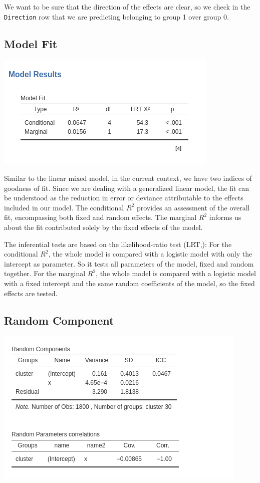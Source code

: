 \documentclass[
]{book}
\begin{document}
We want to be sure that the direction of the effects are clear, so we check in the \texttt{Direction} row that we are predicting belonging to group 1 over group 0.

\hypertarget{model-fit-3}{%
\subsection{Model Fit}\label{model-fit-3}}

\includegraphics[width=0.6\linewidth]{bookletpics/5_logistic_output2}

Similar to the linear mixed model, in the current context, we have two indices of goodness of fit. Since we are dealing with a generalized linear model, the fit can be understood as the reduction in error or deviance attributable to the effects included in our model. The conditional \(R^2\) provides an assessment of the overall fit, encompassing both fixed and random effects. The marginal \(R^2\) informs us about the fit contributed solely by the fixed effects of the model.

The inferential tests are based on the likelihood-ratio test (LRT,): For the conditional \(R^2\), the whole model is compared with a logistic model with only the intercept as parameter. So it tests all parameters of the model, fixed and random together. For the marginal \(R^2\), the whole model is compared with a logistic model with a fixed intercept and the same random coefficients of the model, so the fixed effects are tested.

\hypertarget{random-component}{%
\subsection{Random Component}\label{random-component}}

\includegraphics[width=0.8\linewidth]{bookletpics/5_logistic_output3}
\end{document}
